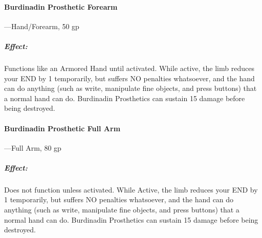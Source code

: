 \documentclass[oneside,11pt,english]{book}
\begin{document}
\paragraph{Burdinadin Prosthetic Forearm}---\quad Hand/Forearm, 50 gp
	\vspace{-15pt} \subparagraph{Effect:} Functions like an Armored Hand until activated. While active, the limb reduces your END by 1 temporarily, but suffers NO penalties whatsoever, and the hand can do anything (such as write, manipulate fine objects, and press buttons) that a normal hand can do. Burdinadin Prosthetics can sustain 15 damage before being destroyed.
\paragraph{Burdinadin Prosthetic Full Arm}---\quad Full Arm, 80 gp
	\vspace{-15pt} \subparagraph{Effect:} Does not function unless activated. While Active, the limb reduces your END by 1 temporarily, but suffers NO penalties whatsoever, and the hand can do anything (such as write, manipulate fine objects, and press buttons) that a normal hand can do. Burdinadin Prosthetics can sustain 15 damage before being destroyed.
\end{document}
